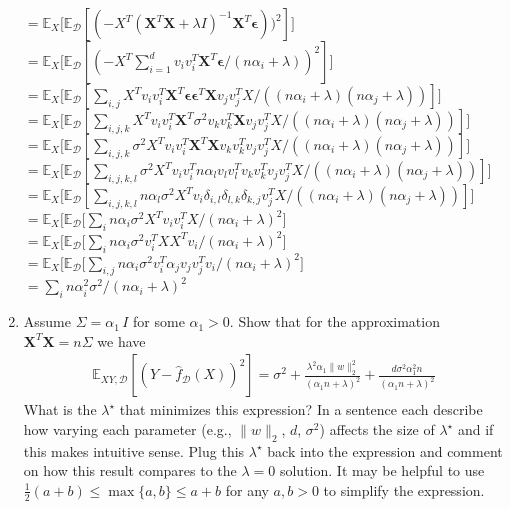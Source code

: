 \documentclass{article}
\newcommand{\1}{\mathbf{1}}
\def\E{\mathbb{E}}
\newcommand{\mb}[1]{\mathbf{#1}}
\newcommand{\mc}[1]{\mathcal{#1}}
\begin{document}
\begin{enumerate}
    $= \E_{X}\big[ \E_{\mc{D}}[ (-X^T (\mb X^T \mb X + \lambda I)^{-1} \mb X^T \boldsymbol{\epsilon}))^2] \big] $\\
    $= \E_{X}\big[ \E_{\mc{D}}[ (-X^T \sum_{i=1}^d v_i v_i^T  \mb X^T \boldsymbol{\epsilon}/(n\alpha_i + \lambda))^2] \big] $\\
    $= \E_{X}\big[ \E_{\mc{D}}[ \sum_{i,j} X^T  v_i v_i^T \mb X^T \boldsymbol{\epsilon} \boldsymbol{\epsilon}^T \mb X v_j v_j^T X  /((n\alpha_i + \lambda) (n\alpha_j + \lambda))] \big] $\\
    $= \E_{X}\big[ \E_{\mc{D}}[ \sum_{i,j,k} X^T  v_i v_i^T \mb X^T \sigma^2  v_k v_k^T \mb X v_j v_j^T X  /((n\alpha_i + \lambda) (n\alpha_j + \lambda))] \big] $\\
    $= \E_{X}\big[ \E_{\mc{D}}[ \sum_{i,j,k} \sigma^2 X^T  v_i v_i^T \mb X^T \mb X  v_k v_k^T v_j v_j^T X  /((n\alpha_i + \lambda) (n\alpha_j + \lambda))] \big] $\\
    $= \E_{X}\big[ \E_{\mc{D}}[ \sum_{i,j,k,l} \sigma^2 X^T  v_i v_i^T n \alpha_l v_l v_l^T  v_k v_k^T v_j v_j^T X  /((n\alpha_i + \lambda) (n\alpha_j + \lambda))] \big] $\\
    $= \E_{X}\big[ \E_{\mc{D}}[ \sum_{i,j,k,l} n \alpha_l \sigma^2 X^T  v_i \delta_{i,l} \delta_{l,k} \delta_{k,j} v_j^T X  /((n\alpha_i + \lambda) (n\alpha_j + \lambda))] \big] $\\
    $= \E_{X}\big[ \E_{\mc{D}}[ \sum_{i} n \alpha_i \sigma^2 X^T  v_i v_i^T X  /(n\alpha_i + \lambda)^2 \big] $\\    
    $= \E_{X}\big[ \E_{\mc{D}}[ \sum_{i} n \alpha_i \sigma^2 v_i^T  X  X^T v_i  /(n\alpha_i + \lambda)^2 \big] $\\    
    $= \E_{X}\big[ \E_{\mc{D}}[ \sum_{i,j} n \alpha_i \sigma^2 v_i ^T \alpha_j  v_j v_j^T v_i  /(n\alpha_i + \lambda)^2 \big] $\\
    $= \sum_{i} n \alpha_i^2 \sigma^2 /(n\alpha_i + \lambda)^2 $\\
    
    \item Assume $\Sigma= \alpha_1 \, I$ for some $\alpha_1 >0$. Show that for the approximation $\mb{X}^T \mb{X} = n \Sigma$ we have
    \begin{align*}
    \E_{XY,\mc{D}}[ (Y-\widehat{f}_{\mc{D}}(X))^2] = \sigma^2 + \frac{\lambda^2 \alpha_1 \|w\|_2^2}{(\alpha_1 n+\lambda)^2} + \frac{d \sigma^2 \alpha_1^2 n}{(\alpha_1 n + \lambda)^2}
    \end{align*}
    What is the $\lambda^\star$ that minimizes this expression? 
    In a sentence each describe how varying each parameter (e.g., $\|w\|_2$, $d$, $\sigma^2$) affects the size of $\lambda^\star$ and if this makes intuitive sense.
    Plug this $\lambda^\star$ back into the expression and comment on how this result compares to the $\lambda=0$ solution. It may be helpful to use $\tfrac{1}{2}(a+b) \leq \max\{a,b\} \leq a+b$ for any $a,b>0$ to simplify the expression.  
    

\end{enumerate}
\end{document}
